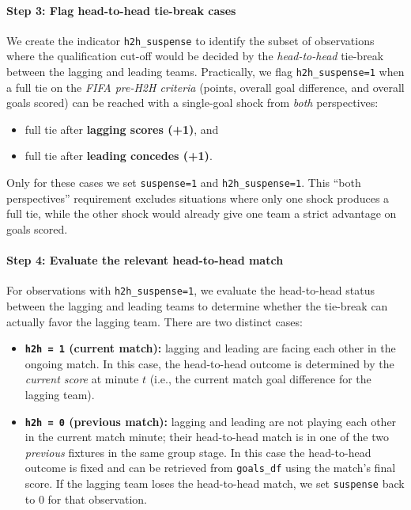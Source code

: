 \documentclass[11pt]{article}
\begin{document}
\paragraph{Step 3: Flag head-to-head tie-break cases }
We create the indicator \texttt{h2h\_suspense} to identify the subset of observations where the qualification cut-off would be decided by the \emph{head-to-head} tie-break between the lagging and leading teams.
Practically, we flag \texttt{h2h\_suspense=1} when a full tie on the \emph{FIFA pre-H2H criteria} (points, overall goal difference, and overall goals scored) can be reached with a single-goal shock from \emph{both} perspectives:
\begin{itemize}
    \item full tie after \textbf{lagging scores (+1)}, and
    \item full tie after \textbf{leading concedes (+1)}.
\end{itemize}
Only for these cases we set \texttt{suspense=1} and \texttt{h2h\_suspense=1}.
This ``both perspectives'' requirement excludes situations where only one shock produces a full tie, while the other shock would already give one team a strict advantage on goals scored.

\paragraph{Step 4: Evaluate the relevant head-to-head match}


For observations with \texttt{h2h\_suspense=1}, we evaluate the head-to-head status between the lagging and leading teams to determine whether the tie-break can actually favor the lagging team.
There are two distinct cases:
\begin{itemize}
    \item \textbf{\texttt{h2h = 1} (current match):} lagging and leading are facing each other in the ongoing match. In this case, the head-to-head outcome is determined by the \emph{current score} at minute $t$ (i.e., the current match goal difference for the lagging team).
    \item \textbf{\texttt{h2h = 0} (previous match):} lagging and leading are not playing each other in the current match minute; their head-to-head match is in one of the two \emph{previous} fixtures in the same group stage. In this case the head-to-head outcome is fixed and can be retrieved from \texttt{goals\_df} using the match's final score. If the lagging team loses the head-to-head match, we set \texttt{suspense} back to 0 for that observation.
\end{itemize}
\end{document}
